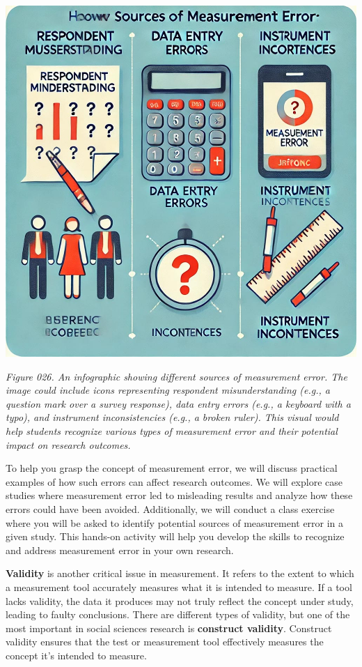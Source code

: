 \documentclass[
]{book}
\begin{document}
\includegraphics[width=1\linewidth,height=\textheight,keepaspectratio]{images/fig026.jpg}

\emph{Figure 026. An infographic showing different sources of measurement error. The image could include icons representing respondent misunderstanding (e.g., a question mark over a survey response), data entry errors (e.g., a keyboard with a typo), and instrument inconsistencies (e.g., a broken ruler). This visual would help students recognize various types of measurement error and their potential impact on research outcomes.}

To help you grasp the concept of measurement error, we will discuss practical examples of how such errors can affect research outcomes. We will explore case studies where measurement error led to misleading results and analyze how these errors could have been avoided. Additionally, we will conduct a class exercise where you will be asked to identify potential sources of measurement error in a given study. This hands-on activity will help you develop the skills to recognize and address measurement error in your own research.

\textbf{Validity} is another critical issue in measurement. It refers to the extent to which a measurement tool accurately measures what it is intended to measure. If a tool lacks validity, the data it produces may not truly reflect the concept under study, leading to faulty conclusions. There are different types of validity, but one of the most important in social sciences research is \textbf{construct validity}. Construct validity ensures that the test or measurement tool effectively measures the concept it's intended to measure.
\end{document}
